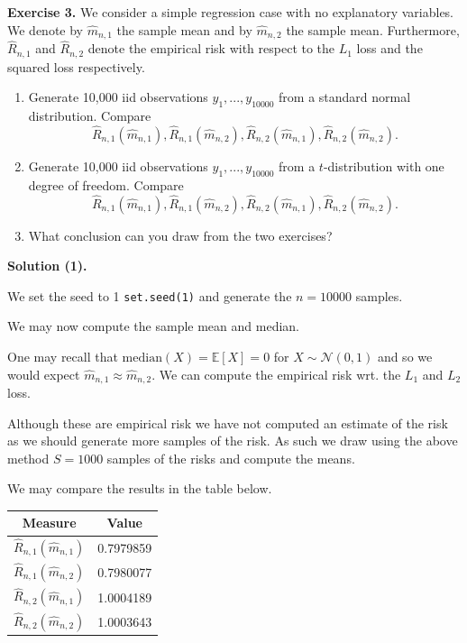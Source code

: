 \documentclass[a4paper,12pt,openany]{book}
\providecommand{\tightlist}{%
 \setlength{\itemsep}{0pt}\setlength{\parskip}{0pt}}
\begin{document}
\textbf{Exercise 3.} We consider a simple regression case with no explanatory variables. We denote by \(\hat m_{n,1}\) the sample mean and by \(\hat m_{n,2}\) the sample mean. Furthermore, \(\hat R_{n,1}\) and \(\hat R_{n,2}\) denote the empirical risk with respect to the \(L_1\) loss and the squared loss respectively.

\begin{enumerate}
\def\labelenumi{\arabic{enumi}.}
\tightlist
\item
  Generate 10,000 iid observations \(y_1,...,y_{10000}\) from a standard normal distribution. Compare
  \[
    \hat R_{n,1}(\hat m_{n,1}),\hat R_{n,1}(\hat m_{n,2}),\hat R_{n,2}(\hat m_{n,1}),\hat R_{n,2}(\hat m_{n,2}).
    \]
\item
  Generate 10,000 iid observations \(y_1,...,y_{10000}\) from a \(t\)-distribution with one degree of freedom. Compare
  \[
    \hat R_{n,1}(\hat m_{n,1}),\hat R_{n,1}(\hat m_{n,2}),\hat R_{n,2}(\hat m_{n,1}),\hat R_{n,2}(\hat m_{n,2}).
    \]
\item
  What conclusion can you draw from the two exercises?
\end{enumerate}

\textbf{Solution (1).}

We set the seed to 1 \texttt{set.seed(1)} and generate the \(n=10000\) samples.

We may now compute the sample mean and median.

One may recall that \(\text{median}(X)=\mathbb E[X]=0\) for \(X\sim \mathcal N(0,1)\) and so we would expect \(\hat m_{n,1}\approx \hat m_{n,2}\). We can compute the empirical risk wrt. the \(L_1\) and \(L_2\) loss.

Although these are empirical risk we have not computed an estimate of the risk as we should generate more samples of the risk. As such we draw using the above method \(S=1000\) samples of the risks and compute the means.

We may compare the results in the table below.

\begin{longtable}[]{@{}cc@{}}
\toprule()
Measure & Value \\
\midrule()
\endhead
\(\hat R_{n,1}(\hat m_{n,1})\) & 0.7979859 \\
\(\hat R_{n,1}(\hat m_{n,2})\) & 0.7980077 \\
\(\hat R_{n,2}(\hat m_{n,1})\) & 1.0004189 \\
\(\hat R_{n,2}(\hat m_{n,2})\) & 1.0003643 \\
\bottomrule()
\end{longtable}
\end{document}
